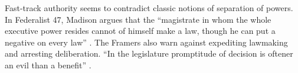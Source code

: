 \documentclass[letter,12pt]{article}
\newcommand{\emm}[1]{\todo[color=red!15, inline]{\textbf{Eric:} #1}}
\newcommand{\ges}[1]{\todo[color=blue!15, inline]{\textbf{Ges:} #1}}
\begin{document}

Fast-track authority seems to contradict classic notions of separation of powers. In Federalist 47, Madison argues that the ``magistrate in whom the whole executive power resides cannot of himself make a law, though he can put a negative on every law'' \citep{madison.47}. The Framers also warn against expediting lawmaking and arresting deliberation. ``In the legislature promptitude of decision is oftener an evil than a benefit'' \citep{hamilton70.1788}.





\end{document}
